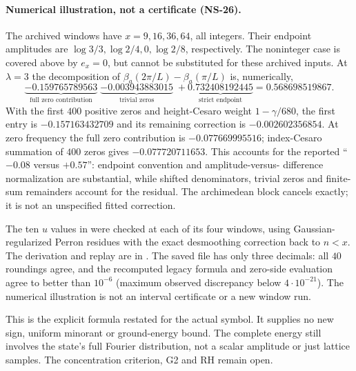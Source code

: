 \paragraph{Numerical illustration, not a certificate (NS-26).}
The archived windows have $x=9,16,36,64$, all integers. Their endpoint
amplitudes are $\log3/3,\log2/4,0,\log2/8$, respectively. The
noninteger case is covered above by $e_x=0$, but cannot be substituted
for these archived inputs. At $\lambda=3$ the decomposition of
$\beta_a(2\pi/L)-\beta_a(\pi/L)$ is, numerically,
\[
 \underbrace{-0.159765789563}_{\text{full zero contribution}}
 \;\underbrace{-0.003943883015}_{\text{trivial zeros}}
 \;+\underbrace{0.732408192445}_{\text{strict endpoint}}
 =0.568698519867.
\]
With the first $400$ positive zeros and height-Cesaro weight
$1-\gamma/680$, the first entry is $-0.157163432709$ and its remaining
correction is $-0.002602356854$. At zero frequency the full zero
contribution is $-0.077669995516$; index-Cesaro summation of $400$
zeros gives $-0.077720711653$. This accounts for the reported
``$-0.08$ versus $+0.57$'': endpoint convention and amplitude-versus-
difference normalization are substantial, while shifted denominators,
trivial zeros and finite-sum remainders account for the residual.
The archimedean block cancels exactly; it is not an unspecified fitted
correction.

The ten $u$ values in 
were checked at each of its four windows, using Gaussian-regularized
Perron residues with the exact desmoothing correction back to $n<x$.
The derivation and replay are in
. The saved file has only
three decimals: all $40$ roundings agree, and the recomputed legacy
formula and zero-side evaluation agree to better than $10^{-6}$
(maximum observed discrepancy below $4\cdot10^{-21}$). The numerical
illustration is not an interval certificate or a new window run.

This is the explicit formula restated for the actual symbol. It
supplies no new sign, uniform minorant or ground-energy bound. The
complete energy still involves the state's full Fourier distribution,
not a scalar amplitude or just lattice samples. The concentration
criterion, G2 and RH remain open.
